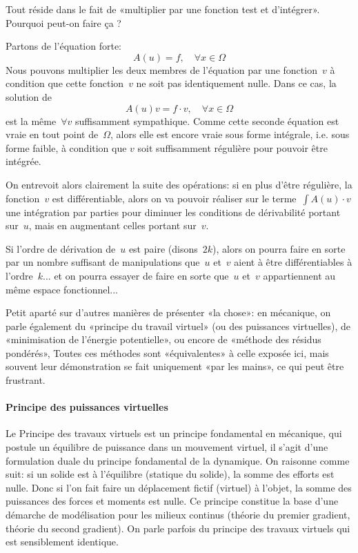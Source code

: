 \begin{remarque}[Justification]
Tout réside dans le fait de «multiplier par une fonction test et d'intégrer».
Pourquoi peut-on faire ça ?

Partons de l'équation forte:
\begin{equation}A(u)=f,\quad \forall x\in\Omega\end{equation}
Nous pouvons multiplier les deux membres de l'équation par une fonction~$v$ à condition que cette fonction~$v$ ne soit pas identiquement nulle. Dans ce cas, la solution de 
\begin{equation}A(u)v=f\cdot v,\quad \forall x\in\Omega\end{equation} 
est la même~$\forall v$ suffisamment sympathique.
Comme cette seconde équation est vraie en tout point de~$\Omega$, alors elle est encore vraie sous forme intégrale, i.e. sous forme faible, à condition que $v$ soit suffisamment régulière pour pouvoir être intégrée.

On entrevoit alors clairement la suite des opérations: si en plus d'être régulière, la fonction~$v$ est différentiable, alors on va pouvoir réaliser sur le terme~$\int A(u)\cdot v$ une intégration par parties pour diminuer les conditions de dérivabilité portant sur~$u$, mais en augmentant celles portant sur~$v$.

Si l'ordre de dérivation de~$u$ est paire (disons~$2k$), alors on pourra faire en sorte par un nombre suffisant de manipulations que~$u$ et~$v$ aient à être différentiables à l'ordre~$k$... et on pourra essayer de faire en sorte que~$u$ et~$v$ appartiennent au même espace fonctionnel...%
\end{remarque}

\begin{remarque}
Petit aparté sur d'autres manières de présenter «la chose»: en mécanique, on parle également du «principe du travail virtuel» (ou des puissances virtuelles), de «minimisation de l'énergie potentielle», ou encore de «méthode des résidus pondérés»,
Toutes ces méthodes sont «équivalentes» à celle exposée ici, mais souvent leur démonstration se fait uniquement «par les mains», ce qui peut être frustrant.
\end{remarque}
%
\paragraph{Principe des puissances virtuelles}
Le Principe des travaux virtuels est un principe fondamental en mécanique, qui postule un équilibre de puissance dans un mouvement virtuel, il s'agit d'une formulation duale du principe fondamental de la dynamique. On raisonne comme suit: si un solide est à l'équilibre (statique du solide), la somme des efforts est nulle. Donc si l'on fait faire un déplacement fictif (virtuel) à l'objet, la somme des puissances des forces et moments est nulle. Ce principe constitue la base d'une démarche de modélisation pour les milieux continus (théorie du premier gradient, théorie du second gradient). On parle parfois du principe des travaux virtuels qui est sensiblement identique.

